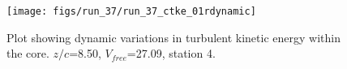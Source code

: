 \begin{figure}[H]
\centering
\texttt{[image: figs/run\_37/run\_37\_ctke\_01rdynamic]}
\caption{Plot showing dynamic variations in turbulent kinetic energy within the core. $z/c$=8.50, $V_{free}$=27.09, station 4.}
\label{fig:run_37_ctke_01rdynamic}
\end{figure}


